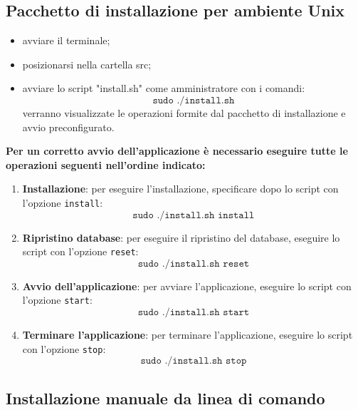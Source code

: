 \documentclass[12pt,a4paper]{article}
\begin{document}
		\subsection{Pacchetto di installazione per ambiente Unix}
		\begin{itemize}
			\item avviare il terminale;
			\item posizionarsi nella cartella src;
			\item avviare lo script "install.sh" come amministratore con i comandi:
		\[ 	\texttt{sudo  ./install.sh} \]
		verranno visualizzate le operazioni formite dal pacchetto di installazione e avvio preconfigurato.
	\end{itemize}
		\textbf{Per un corretto avvio dell'applicazione è necessario eseguire tutte le operazioni seguenti nell'ordine indicato:}
	\begin{enumerate}
		\item \textbf{Installazione}: per eseguire l'installazione, specificare dopo lo script con l'opzione \texttt{install}:
	 \[ 	\texttt{sudo  ./install.sh install} \]
		\item \textbf{Ripristino database}: per eseguire il ripristino del database, eseguire lo script con l'opzione \texttt{reset}:
		 \[ 	\texttt{sudo  ./install.sh reset} \]
		\item \textbf{Avvio dell'applicazione}: per avviare l'applicazione, eseguire lo script con l'opzione \texttt{start}:
		 \[ 	\texttt{sudo  ./install.sh start} \]
		\item \textbf{Terminare l'applicazione}: per terminare l'applicazione, eseguire lo script con l'opzione \texttt{stop}:
			 \[ 	\texttt{sudo  ./install.sh stop} \]
	
			

		\end{enumerate}
	\subsection{Installazione manuale da linea di comando}
\end{document}
